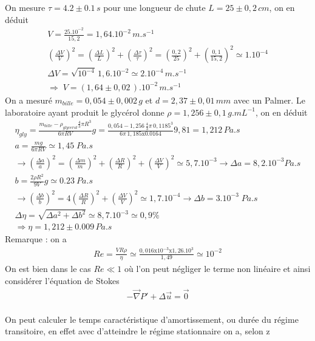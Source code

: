 \documentclass[12pt,prb,aps,epsf]{report}
\begin{document}
On mesure $\tau = 4.2 \pm 0.1\, s$ pour une longueur de chute $L=25\pm0,2\,cm$, on en déduit 
\begin{eqnarray}
V = \frac{25.10^{-2}}{15,2}=1,64.10^{-2}\, m.s^{-1}\\
\left(\frac{\Delta V}{V}\right)^2 = \left(\frac{\Delta L}{L}\right)^2 + \left(\frac{\Delta \tau}{\tau}\right)^2 = \left(\frac{0,2}{25}\right)^2 + \left(\frac{ 0,1}{15,2}\right)^2 \simeq 1.10^{-4}\\
\Delta V = \sqrt{10^{-4}}\,1,6.10^{-2} \simeq 2.10^{-4}\, m.s^{-1}\\
\Longrightarrow \; V = (1,64 \pm 0,02\,).10^{-2}\, m.s^{-1}
\end{eqnarray}
On a mesuré $m_{bille} = 0,054\pm 0,002\,g$ et $d = 2,37\pm0,01\,mm$ avec un Palmer. Le laboratoire ayant produit le glycérol donne $\rho = 1,256\pm0,1\,g.mL^{-1}$, on en déduit 
\begin{eqnarray}
\eta_{gly} = \frac{m_{bille} - \rho_{glycerol} \frac{4}{3}\pi R^3}{6\pi RV}g = \frac{0,054 - 1,256\,\frac{4}{3}\pi\, 0,1185^3}{6\pi\,1,185\mathrm{x}0.0164}9,81 = 1,212\,Pa.s\\
a = \frac{mg}{6\pi RV} \simeq 1,45\;Pa.s\\
\longrightarrow \left(\frac{\Delta a}{a}\right)^2 =\left(\frac{\Delta m}{m}\right)^2 + \left(\frac{\Delta R}{R}\right)^2+\left(\frac{\Delta V}{V}\right)^2 \simeq 5,7.10^{-3}\longrightarrow \Delta a = 8,2.10^{-3}Pa.s\\
b = \frac{2\rho R^2}{9 V}g\simeq 0.23\:Pa.s\\
\longrightarrow \left(\frac{\Delta b}{b}\right)^2 =4\left(\frac{\Delta R}{R}\right)^2+\left(\frac{\Delta V}{V}\right)^2 \simeq 1,7.10^{-4} \longrightarrow \Delta b = 3.10^{-3}\;Pa.s\;\; \\
\Delta \eta = \sqrt{\Delta a ^2 + \Delta b ^2} \simeq 8,7.10^{-3} \simeq 0,9\%\;\;\\
\Longrightarrow \eta = 1,212\pm 0.009\,Pa.s\;\;
\end{eqnarray}
Remarque : on a 
\begin{eqnarray}
Re = \frac{VR\rho}{\eta} \simeq \frac{0,016\mathrm{x}10^{-3}\mathrm{x}1,26.10^3}{1,49} \simeq 10^{-2}
\end{eqnarray}
On est bien dans le cas $Re\ll1$ où l'on peut négliger le terme non linéaire et ainsi considérer l'équation de Stokes
\begin{eqnarray}
-\vec{\nabla}P' + \Delta \vec{u} = \vec{0}
\end{eqnarray}
\\
On peut calculer le temps caractéristique d'amortissement, ou durée du régime transitoire, en effet avec d'atteindre le régime stationnaire on a, selon z
\end{document}
